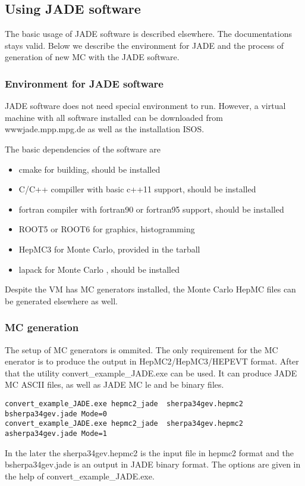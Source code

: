 \subsection{Using JADE software}
The basic usage of JADE software is described elsewhere.
The documentations stays valid.
Below we describe the environment for JADE and the process of generation of new MC with the JADE software.

\subsubsection{Environment for JADE software}
JADE software does not need special environment to run.
However, a virtual machine with all software installed can be downloaded 
from wwwjade.mpp.mpg.de as well as the installation ISOS.

The basic dependencies of the software are 
\begin{itemize}
\item cmake for building, should be installed
\item C/C++ compiller with basic c++11 support, should be installed
\item fortran compiler with fortran90 or fortran95 support, should be installed
\item ROOT5 or ROOT6 for graphics, histogramming
\item HepMC3 for Monte Carlo, provided in the tarball 
\item lapack for Monte Carlo , should be installed
\end{itemize}
Despite the VM has MC generators installed, the  Monte Carlo HepMC files can be generated elsewhere as well.


\subsubsection{MC generation}

The setup of MC generators is ommited.
The only requirement for the MC enerator is to produce the 
output in HepMC2/HepMC3/HEPEVT format.
After that the utility convert\_example\_JADE.exe can be used.
It can produce JADE MC ASCII  files, as well as JADE MC le and be binary files.

\begin{Verbatim}[fontsize=\tiny]
convert_example_JADE.exe hepmc2_jade  sherpa34gev.hepmc2   bsherpa34gev.jade Mode=0
convert_example_JADE.exe hepmc2_jade  sherpa34gev.hepmc2   asherpa34gev.jade Mode=1
\end{Verbatim}
In the later the sherpa34gev.hepmc2 is the input file in hepmc2 format and the bsherpa34gev.jade is an output in JADE binary format.
The options are given in the help of convert\_example\_JADE.exe.

